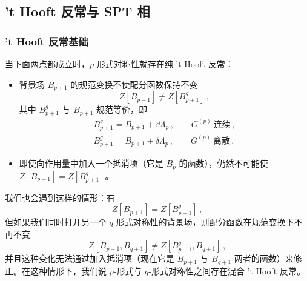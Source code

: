 \subsection{'t Hooft 反常与 SPT 相}

\subsubsection{'t Hooft 反常基础}

 当下面两点都成立时，$p$-形式对称性就存在纯 't Hooft 反常：
\begin{itemize}[leftmargin=1.4em,itemsep=1pt,topsep=1pt]
\item 背景场 $B_{p+1}$ 的规范变换不使配分函数保持不变
\begin{equation}
  Z[B_{p+1}]\neq Z[B^g_{p+1}]\,, \tag{4.34}
\end{equation}
其中 $B^g_{p+1}$ 与 $B_{p+1}$ 规范等价，即
\begin{equation}
\begin{gathered}
  B^g_{p+1}=B_{p+1}+\dd\Lambda_p\,,\qquad G^{(p)}\ \text{连续}\,,\\
  B^g_{p+1}=B_{p+1}+\delta\Lambda_p\,,\qquad G^{(p)}\ \text{离散}\,.
\end{gathered}
\tag{4.35}
\end{equation}
\item 即使向作用量中加入一个抵消项（它是 $B_p$ 的函数），仍然不可能使 $Z[B_{p+1}]=Z[B^g_{p+1}]$。
\end{itemize}


 我们也会遇到这样的情形：有
\begin{equation}
  Z[B_{p+1}]=Z[B^g_{p+1}]\,, \tag{4.36}
\end{equation}
但如果我们同时打开另一个 $q$-形式对称性的背景场，则配分函数在规范变换下不再不变
\begin{equation}
  Z[B_{p+1},B_{q+1}]\neq Z[B^g_{p+1},B_{q+1}]\,, \tag{4.37}
\end{equation}
并且这种变化无法通过加入抵消项（现在它是 $B_{p+1}$ 与 $B_{q+1}$ 两者的函数）来修正。在这种情形下，我们说 $p$-形式与 $q$-形式对称性之间存在混合 't Hooft 反常。

